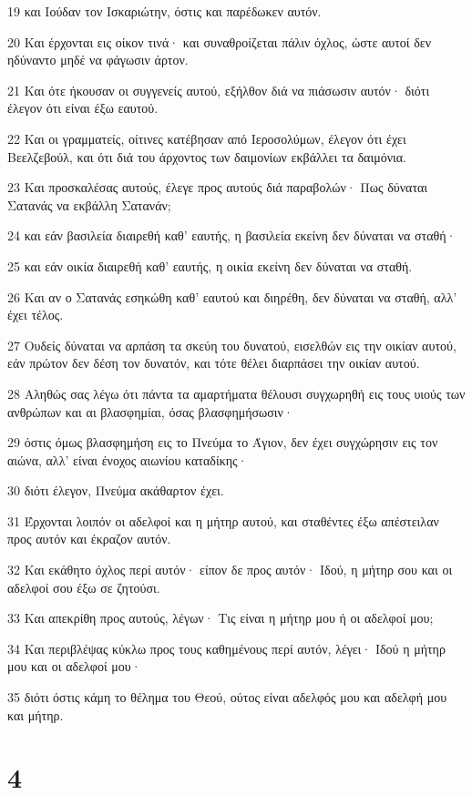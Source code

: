 \par 19 και Ιούδαν τον Ισκαριώτην, όστις και παρέδωκεν αυτόν.
\par 20 Και έρχονται εις οίκον τινά· και συναθροίζεται πάλιν όχλος, ώστε αυτοί δεν ηδύναντο μηδέ να φάγωσιν άρτον.
\par 21 Και ότε ήκουσαν οι συγγενείς αυτού, εξήλθον διά να πιάσωσιν αυτόν· διότι έλεγον ότι είναι έξω εαυτού.
\par 22 Και οι γραμματείς, οίτινες κατέβησαν από Ιεροσολύμων, έλεγον ότι έχει Βεελζεβούλ, και ότι διά του άρχοντος των δαιμονίων εκβάλλει τα δαιμόνια.
\par 23 Και προσκαλέσας αυτούς, έλεγε προς αυτούς διά παραβολών· Πως δύναται Σατανάς να εκβάλλη Σατανάν;
\par 24 και εάν βασιλεία διαιρεθή καθ' εαυτής, η βασιλεία εκείνη δεν δύναται να σταθή·
\par 25 και εάν οικία διαιρεθή καθ' εαυτής, η οικία εκείνη δεν δύναται να σταθή.
\par 26 Και αν ο Σατανάς εσηκώθη καθ' εαυτού και διηρέθη, δεν δύναται να σταθή, αλλ' έχει τέλος.
\par 27 Ουδείς δύναται να αρπάση τα σκεύη του δυνατού, εισελθών εις την οικίαν αυτού, εάν πρώτον δεν δέση τον δυνατόν, και τότε θέλει διαρπάσει την οικίαν αυτού.
\par 28 Αληθώς σας λέγω ότι πάντα τα αμαρτήματα θέλουσι συγχωρηθή εις τους υιούς των ανθρώπων και αι βλασφημίαι, όσας βλασφημήσωσιν·
\par 29 όστις όμως βλασφημήση εις το Πνεύμα το Άγιον, δεν έχει συγχώρησιν εις τον αιώνα, αλλ' είναι ένοχος αιωνίου καταδίκης·
\par 30 διότι έλεγον, Πνεύμα ακάθαρτον έχει.
\par 31 Έρχονται λοιπόν οι αδελφοί και η μήτηρ αυτού, και σταθέντες έξω απέστειλαν προς αυτόν και έκραζον αυτόν.
\par 32 Και εκάθητο όχλος περί αυτόν· είπον δε προς αυτόν· Ιδού, η μήτηρ σου και οι αδελφοί σου έξω σε ζητούσι.
\par 33 Και απεκρίθη προς αυτούς, λέγων· Τις είναι η μήτηρ μου ή οι αδελφοί μου;
\par 34 Και περιβλέψας κύκλω προς τους καθημένους περί αυτόν, λέγει· Ιδού η μήτηρ μου και οι αδελφοί μου·
\par 35 διότι όστις κάμη το θέλημα του Θεού, ούτος είναι αδελφός μου και αδελφή μου και μήτηρ.

\chapter{4}

